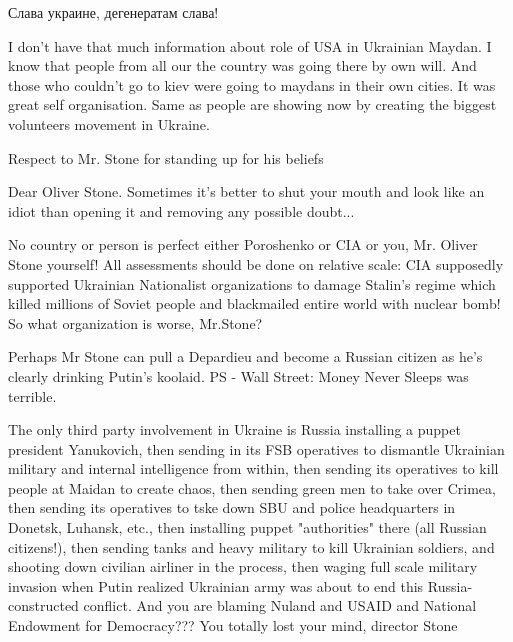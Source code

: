 \begin{itemize}
\begin{itemize} %
Слава украине, дегенератам слава!
\end{itemize} %


I don't have that much information about role of USA in Ukrainian Maydan. I
know that people from all our the country was going there by own will. And
those who couldn't go to kiev were going to maydans in their own cities. It was
great self organisation. Same as people are showing now by creating the biggest
volunteers movement in Ukraine.


Respect to Mr. Stone for standing up for his beliefs


Dear Oliver Stone. Sometimes it's better to shut your mouth and look like an
idiot than opening it and removing any possible doubt...


No country or person is perfect either Poroshenko or CIA or you, Mr. Oliver
Stone yourself! All assessments should be done on relative scale: CIA
supposedly supported Ukrainian Nationalist organizations to damage Stalin's
regime which killed millions of Soviet people and blackmailed entire world with
nuclear bomb! So what organization is worse, Mr.Stone?


Perhaps Mr Stone can pull a Depardieu and become a Russian citizen as he's
clearly drinking Putin's koolaid. PS - Wall Street: Money Never Sleeps was
terrible.


The only third party involvement in Ukraine is Russia installing a puppet
president Yanukovich, then sending in its FSB operatives to dismantle Ukrainian
military and internal intelligence from within, then sending its operatives to
kill people at Maidan to create chaos, then sending green men to take over
Crimea, then sending its operatives to tske down SBU and police headquarters in
Donetsk, Luhansk, etc., then installing puppet "authorities" there (all Russian
citizens!), then sending tanks and heavy military to kill Ukrainian soldiers,
and shooting down civilian airliner in the process, then waging full scale
military invasion when Putin realized Ukrainian army was about to end this
Russia-constructed conflict. And you are blaming Nuland and USAID and National
Endowment for Democracy??? You totally lost your mind, director Stone


\end{itemize}
